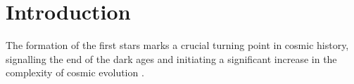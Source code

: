 \section{Introduction}
\label{intro}

The formation of the first stars marks a crucial turning point in cosmic history, signalling the end of the dark ages and initiating a significant increase in the complexity of cosmic evolution \citep{BarkanaLoeb2001,Miralda-Escude2003,Brommetal2009,Loeb2010}.